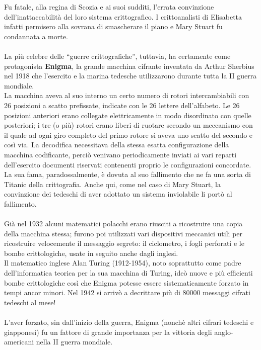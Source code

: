 \documentclass[a4paper,12pt]{article}
\begin{document}
Fu fatale, alla regina di Scozia e ai suoi sudditi, l’errata convinzione dell'inattaccabilità del loro sistema crittografico. I crittoanalisti di Elisabetta infatti permisero alla sovrana di smascherare il piano e Mary Stuart fu condannata a morte.\\\\
La più celebre delle ``guerre crittografiche'', tuttavia, ha certamente come protagonista \textbf{Enigma}, la grande macchina cifrante inventata da Arthur Sherbius nel 1918 che l'esercito e la marina tedesche utilizzarono durante tutta la II guerra mondiale.\\
La macchina aveva al suo interno un certo numero di rotori intercambiabili con 26 posizioni a scatto prefissate, indicate con le 26 lettere dell'alfabeto. Le 26 posizioni anteriori erano collegate elettricamente in modo disordinato con quelle posteriori; i tre (o più) rotori erano liberi di ruotare secondo un meccanismo con il quale ad ogni giro completo del primo rotore si aveva uno scatto del secondo e così via.
La decodifica necessitava della stessa esatta configurazione della macchina codificante, perciò venivano periodicamente inviati ai vari reparti dell'esercito documenti riservati contenenti proprio le configurazioni concordate.\\
La sua fama, paradossalmente, è dovuta al suo fallimento che ne fa una sorta di Titanic della crittografia. Anche qui, come nel caso di Mary Stuart, la convinzione dei tedeschi di aver adottato un sistema inviolabile li portò al fallimento.\\\\
Già nel 1932 alcuni matematici polacchi erano riusciti a ricostruire una copia della macchina stessa; furono poi utilizzati vari dispositivi meccanici utili per ricostruire velocemente il messaggio segreto: il ciclometro, i fogli perforati e le bombe crittologiche, usate in seguito anche dagli inglesi.\\
Il matematico inglese Alan Turing (1912-1954), noto soprattutto come padre dell'informatica teorica per la sua macchina di Turing, ideò nuove e più efficienti bombe crittologiche così che Enigma potesse essere sistematicamente forzato in tempi ancor minori. Nel 1942 si arrivò a decrittare più di 80000 messaggi cifrati tedeschi al mese!\\\\
L'aver forzato, sin dall'inizio della guerra, Enigma (nonchè altri cifrari tedeschi e giapponesi) fu un fattore di grande importanza per la vittoria degli anglo-americani nella II guerra mondiale.\\
\end{document}
